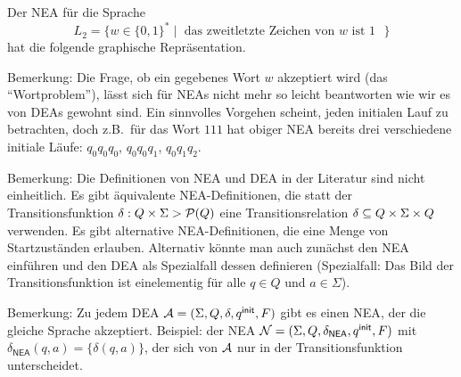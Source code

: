 {\begin{Bsp}
\label{bsp:2.zweitletztes} Der \acs*{NEA} für die Sprache 
$$L_2=\{w\in\{0,1\}^*\mid \text{ das zweitletzte Zeichen von $w$ ist $1$ }\}$$ hat die folgende graphische Repräsentation.
  \begin{center}
  \end{center}
\end{Bsp}


Bemerkung: Die Frage, ob ein gegebenes Wort $w$ akzeptiert wird (das "`Wortproblem"'), lässt sich für \acs*{NEA}s nicht mehr so leicht beantworten wie wir es von \acs*{DEA}s gewohnt sind.
Ein sinnvolles Vorgehen scheint, jeden initialen Lauf zu betrachten, doch z.B.\ für das Wort $111$ hat obiger \acs*{NEA} bereits  drei verschiedene initiale Läufe: $q_0q_0q_0$, $q_0q_0q_1$, $q_0q_1q_2$.


Bemerkung: Die Definitionen von \ac{NEA} und \ac{DEA} in der Literatur sind nicht einheitlich. 
Es gibt äquivalente \ac{NEA}-Definitionen, die statt der Transitionsfunktion $\delta:Q\times\Sigma\->\mathcal{P}(Q)$ eine Transitionsrelation $\delta\subseteq Q\times\Sigma\times Q$ verwenden.
Es gibt alternative \ac{NEA}-Definitionen, die eine Menge von Startzuständen erlauben.
Alternativ könnte man auch zunächst den \ac{NEA} einführen und den \ac{DEA} als Spezialfall dessen definieren (Spezialfall: Das Bild der Transitionsfunktion ist einelementig für alle $q\in Q$ und $a\in\Sigma$).

Bemerkung: Zu jedem \ac{DEA} $\mathcal{A}= (\Sigma, Q,\delta,q^\mathsf{init},F)$ gibt es einen \ac{NEA}, der die gleiche Sprache akzeptiert.
Beispiel: der \ac{NEA} $\mathcal{N}= (\Sigma, Q,\delta_\mathsf{NEA},q^\mathsf{init},F)$ mit $\delta_\mathsf{NEA}(q,a)=\{\delta(q,a)\}$, der sich von $\mathcal{A}$ nur in der Transitionsfunktion unterscheidet.


}
